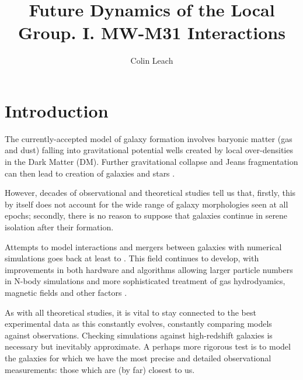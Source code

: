 \documentclass[twocolumn]{aastex63}
\newcommand{\todo}{\color{red}{TODO}\color{black}\hspace{2mm}}
\begin{document}
	
\title{Future Dynamics of the Local Group. I. MW-M31 Interactions}

\author[0000-0003-3608-1546]{Colin Leach}

\begin{abstract}
	
\todo{Add a concise and intelligent summary of the paper, once I get a clearer idea what it will include (and how to seem intelligent).}\vspace{5mm}

\lipsum[1-1]
	
\end{abstract}




\section{Introduction}

The currently-accepted model of galaxy formation involves baryonic matter (gas and dust) falling into gravitational potential wells created by local over-densities in the Dark Matter (DM). Further gravitational collapse and Jeans fragmentation can then lead to creation of galaxies and stars \citep{mo_galaxy_2010}.

However, decades of observational and theoretical studies tell us that, firstly, this by itself does not account for the wide range of galaxy morphologies seen at all epochs; secondly, there is no reason to suppose that galaxies continue in serene isolation after their formation.

Attempts to model interactions and mergers between galaxies with numerical simulations goes back at least to \citet{toomre_galactic_1972}. This field continues to develop, with improvements in both hardware and algorithms allowing larger particle numbers in N-body simulations and more sophisticated treatment of gas hydrodyamics, magnetic fields and other factors \citep{bodenheimer_numerical_2007}.

As with all theoretical studies, it is vital to stay connected to the best experimental data as this constantly evolves, constantly comparing models against observations. Checking simulations against high-redshift galaxies is necessary but inevitably approximate. A perhaps more rigorous test is to model the galaxies for which we have the most precise and detailed observational measurements: those which are (by far) closest to us. 
\end{document}
